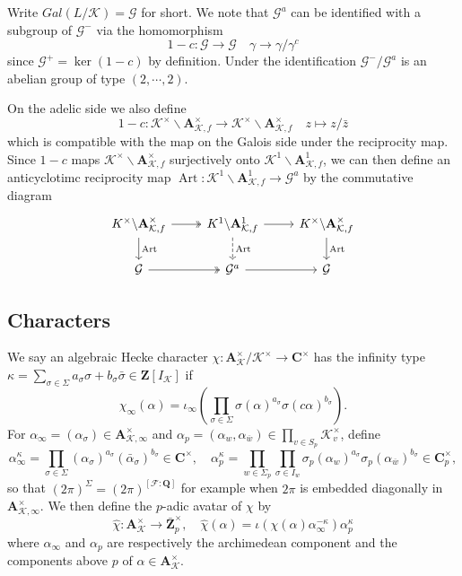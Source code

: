 \documentclass[leqno]{amsart}
\theoremstyle{definition}
\theoremstyle{remark}
\newcommand{\Q}{{\mathbf{Q}}}
\newcommand{\Z}{{\mathbf{Z}}}
\newcommand{\C}{\mathbf C}
\newcommand{\A}{\mathbf A}
\DeclareMathOperator{\Art}{Art}
\newcommand{\F}{{\mathcal{F}}} %
\newcommand{\K}{{\mathcal{K}}} %
\newcommand{\bw}{{\overline{w}}}
\newcommand{\cG}{\mathcal{G}}
\begin{document}
Write $Gal(L/\K)=\cG$ for short.
We note that $\cG^a$ can be
identified with a subgroup of $\cG^-$ via the homomorphism
\[
    1-c\colon \cG\to \cG\quad \gamma\to \gamma/\gamma^c
\]
since $\cG^+=\ker(1-c)$ by definition.
Under the identification
$\cG^-/\cG^a$ is an abelian group of type $(2,\cdots,2)$.

On the adelic side we also define
\[
1-c\colon \K^\times\backslash\A_{\K,f}^\times\to
\K^\times\backslash\A_{\K,f}^\times\quad
z\mapsto z/\bar{z}
\]
which is compatible with the map on the Galois side
under the reciprocity map.
Since $1-c$ maps $\K^\times\backslash \A_{\K,f}^\times$
surjectively onto  $\K^1\backslash \A_{\K,f}^1$,
we can then define an anticyclotimc
reciprocity map $\Art\colon \K^1\backslash\A_{\K,f}^1\to \cG^a$
by the commutative diagram
\begin{equation}\label{eq:anticyc_rec}
\begin{tikzcd}
    K^\times\backslash\A_{\K,f}^\times
    \arrow[r,twoheadrightarrow]\arrow[d,"\Art"]&
    K^1\backslash\A_{\K,f}^1 \arrow[r]\arrow[d,"\Art",dashed]&
    K^\times\backslash\A_{\K,f}^\times\arrow[d,"\Art"]\\
    \cG \arrow[r,twoheadrightarrow]&
    \cG^a\arrow[r]&
    \cG
\end{tikzcd}
\end{equation}



\subsection{Characters}
 
We say an algebraic Hecke character 
$\chi\colon \A_\K^\times/\K^\times\to \C^\times$ 
has the infinity type $\kappa=\sum_{\sigma\in \Sigma} 
a_\sigma\sigma+b_\sigma\bar{\sigma} \in \Z[I_\K]$ if
\[
    \chi_\infty(\alpha)=
    \iota_\infty \left(\prod_{\sigma\in \Sigma} 
    \sigma(\alpha)^{a_\sigma}\sigma(c \alpha)^{b_\sigma}\right).
\]
For $\alpha_\infty=(\alpha_\sigma)\in \A_{\K,\infty}^\times$
and $\alpha_p=(\alpha_w,\alpha_{\bw})\in \prod_{v\in S_p}\K_v^\times$, 
define
\[
    \alpha_\infty^\kappa=
    \prod_{\sigma\in \Sigma} 
    (\alpha_\sigma)^{a_\sigma}(\bar{\alpha}_\sigma)^{b_\sigma}\in \C^\times,\quad
    \alpha_p^\kappa=
    \prod_{w\in \Sigma_p}
    \prod_{\sigma\in I_w}
    \sigma_p(\alpha_w)^{a_\sigma}\sigma_p(\alpha_{\bw})^{b_\sigma}\in \C_p^\times,
\]
so that  $(2\pi)^\Sigma=(2\pi)^{[\F:\Q]}$ for example
when $2\pi$ is embedded diagonally in $\A_{\K,\infty}^\times$.
We then define the $p$-adic avatar of $\chi$ by
\[
    \hat{\chi}\colon \A_\K^\times\to \bar{\Z}_p^\times,\quad
    \hat{\chi}(\alpha)=\iota(\chi(\alpha)\alpha_\infty^{-\kappa})\alpha_p^{\kappa}
\]
where $\alpha_\infty$ and $\alpha_p$ are respectively 
the archimedean component and the components above $p$ of $\alpha\in \A_\K^\times$.
\end{document}
